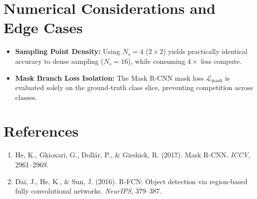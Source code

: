 \documentclass[11pt,a4paper]{article}
\theoremstyle{definition}
\begin{document}
\section{Numerical Considerations and Edge Cases}

\begin{itemize}
    \item \textbf{Sampling Point Density:} Using $N_s = 4$ ($2 \times 2$) yields practically identical accuracy to dense sampling ($N_s = 16$), while consuming $4\times$ less compute.
    \item \textbf{Mask Branch Loss Isolation:} The Mask R-CNN mask loss $\mathcal{L}_{\text{mask}}$ is evaluated solely on the ground-truth class slice, preventing competition across classes.
\end{itemize}

\section{References}
\begin{enumerate}
    \item He, K., Gkioxari, G., Doll{\'a}r, P., \& Girshick, R. (2017). Mask R-CNN. \emph{ICCV}, 2961--2969.
    \item Dai, J., He, K., \& Sun, J. (2016). R-FCN: Object detection via region-based fully convolutional networks. \emph{NeurIPS}, 379--387.
\end{enumerate}
\end{document}
